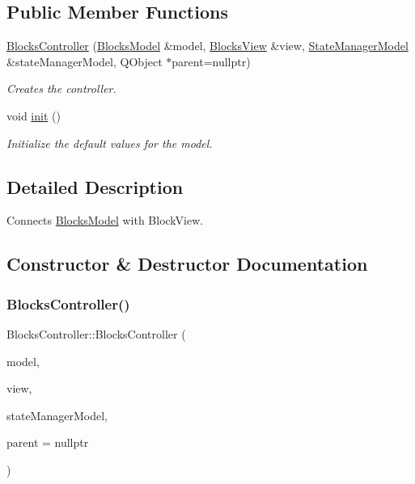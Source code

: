\subsection*{Public Member Functions}
\begin{DoxyCompactItemize}
\item 
\mbox{\hyperlink{class_blocks_controller_a477c727edcc0d3fd121beae431d7539b}{Blocks\+Controller}} (\mbox{\hyperlink{class_blocks_model}{Blocks\+Model}} \&model, \mbox{\hyperlink{class_blocks_view}{Blocks\+View}} \&view, \mbox{\hyperlink{class_state_manager_model}{State\+Manager\+Model}} \&state\+Manager\+Model, Q\+Object $\ast$parent=nullptr)
\begin{DoxyCompactList}\small\item\em Creates the controller. \end{DoxyCompactList}\item 
void \mbox{\hyperlink{class_blocks_controller_a469ef02a49634593039a88e96dcff22c}{init}} ()
\begin{DoxyCompactList}\small\item\em Initialize the default values for the model. \end{DoxyCompactList}\end{DoxyCompactItemize}


\subsection{Detailed Description}
Connects \mbox{\hyperlink{class_blocks_model}{Blocks\+Model}} with Block\+View. 



\subsection{Constructor \& Destructor Documentation}
\mbox{\label{class_blocks_controller_a477c727edcc0d3fd121beae431d7539b}} 
\subsubsection{\texorpdfstring{BlocksController()}{BlocksController()}}
{\footnotesize\ttfamily Blocks\+Controller\+::\+Blocks\+Controller (\begin{DoxyParamCaption}\item[{\mbox{\hyperlink{class_blocks_model}{Blocks\+Model}} \&}]{model,  }\item[{\mbox{\hyperlink{class_blocks_view}{Blocks\+View}} \&}]{view,  }\item[{\mbox{\hyperlink{class_state_manager_model}{State\+Manager\+Model}} \&}]{state\+Manager\+Model,  }\item[{Q\+Object $\ast$}]{parent = {\ttfamily nullptr} }\end{DoxyParamCaption})\hspace{0.3cm}{\ttfamily [explicit]}}



